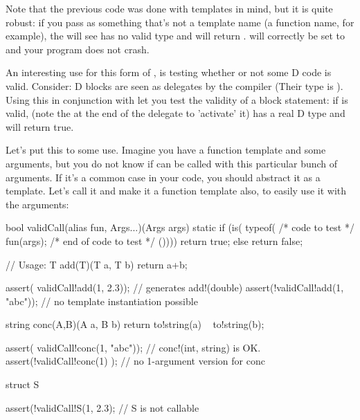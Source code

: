 Note that the previous code was done with templates in mind, but it is quite robust: if you pass as  something that's not a template name (a func\-tion name, for ex\-am\-ple), the  will see  has no valid type and will return .   will cor\-rec\-tly be set to  and your program does not crash.


An interesting use for this form of , is testing whether or not some D code is valid. Consider: D blocks are seen as delegates by the compiler (Their type is \DD{()}). Using this in conjunction with  let you test the validity of a block statement: if  is valid,  (note the \DD{()} at the end of the delegate to 'activate' it) has a real D type and  will return true.

Let's put this to some use. Imagine you have a function template  and some arguments, but you do not know if  can be called with this particular bunch of arguments. If it's a common case in your code, you should abstract it as a template. Let's call it  and make it a function template also, to easily use it with the arguments:

\begin{dcode}
bool validCall(alias fun, Args...)(Args args) 
{
    static if (is( typeof({ /* code to test */
                            fun(args);
                            /* end of code to test */
                          }())))
        return true;
    else
        return false;
}

// Usage:
T add(T)(T a, T b) { return a+b;}

assert( validCall!add(1, 2.3));   // generates add!(double)
assert(!validCall!add(1, "abc")); // no template instantiation possible

string conc(A,B)(A a, B b) { return to!string(a) ~ to!string(b);}

assert( validCall!conc(1, "abc")); // conc!(int, string) is OK.
assert(!validCall!conc(1)       ); // no 1-argument version for conc

struct S {}

assert(!validCall!S(1, 2.3); // S is not callable
\end{dcode}

